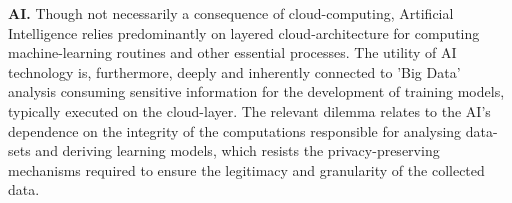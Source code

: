 \documentclass[twocolumn]{scrartcl}
\begin{document}
\textbf{AI.} Though not necessarily a consequence of cloud-computing, Artificial Intelligence relies predominantly on layered cloud-architecture for computing machine-learning routines and other essential processes. The utility of AI technology is, furthermore, deeply and inherently connected to 'Big Data' analysis consuming sensitive information for the development of training models, typically executed on the cloud-layer. The relevant dilemma relates to the AI's dependence on the integrity of the computations responsible for analysing data-sets and deriving learning models, which resists the privacy-preserving mechanisms required to ensure the legitimacy and granularity of the collected data.
\end{document}
